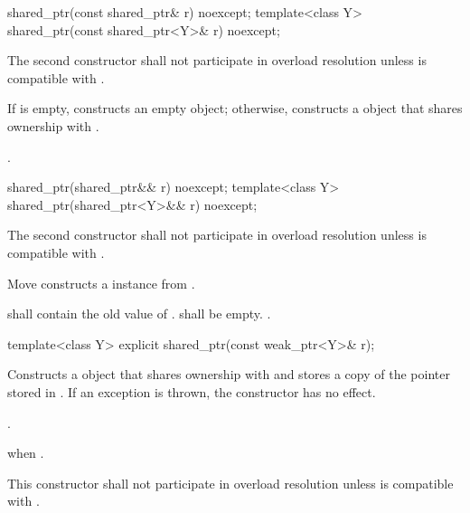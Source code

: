 %
\begin{itemdecl}
shared_ptr(const shared_ptr& r) noexcept;
template<class Y> shared_ptr(const shared_ptr<Y>& r) noexcept;
\end{itemdecl}

\begin{itemdescr}
\pnum
\remarks
The second constructor shall not participate in overload resolution unless
 is compatible with .

\pnum
\effects
If  is empty, constructs
an empty  object; otherwise, constructs
a  object that shares ownership with .

\pnum
\ensures
{}.
\end{itemdescr}

%
\begin{itemdecl}
shared_ptr(shared_ptr&& r) noexcept;
template<class Y> shared_ptr(shared_ptr<Y>&& r) noexcept;
\end{itemdecl}

\begin{itemdescr}
\pnum
\remarks
The second constructor shall not participate in overload resolution unless
 is compatible with .

\pnum
\effects
Move constructs a  instance from .

\pnum
\ensures
{} shall contain the old value of
.  shall be empty. .
\end{itemdescr}

%
%
\begin{itemdecl}
template<class Y> explicit shared_ptr(const weak_ptr<Y>& r);
\end{itemdecl}

\begin{itemdescr}
\pnum
\effects
Constructs a  object that shares ownership with
 and stores a copy of the pointer stored in .
If an exception is thrown, the constructor has no effect.

\pnum
\ensures
{}.

\pnum
\throws
{} when .

\pnum
\remarks
This constructor shall not participate in overload resolution unless
 is compatible with .
\end{itemdescr}

